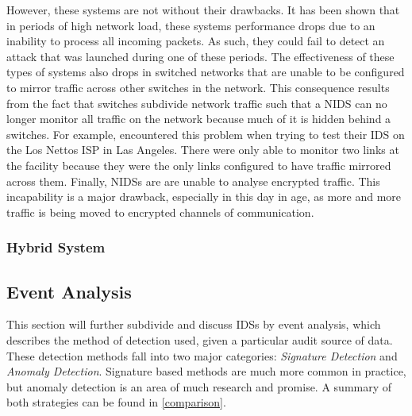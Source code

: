 \documentclass{acm_proc_article-sp}
\begin{document}
    		However, these systems are not without their drawbacks. It has been shown that in periods of high network load, these systems performance drops due to an inability to process all incoming packets. As such, they could fail to detect an attack that was launched during one of these periods. The effectiveness of these types of systems also drops in switched networks that are unable to be configured to mirror traffic across other switches in the network. This consequence results from the fact that switches subdivide network traffic such that a NIDS can no longer monitor all traffic on the network because much of it is hidden behind a switches. For example, \cite{Hussain2003} encountered this problem when trying to test their IDS on the Los Nettos ISP in Las Angeles. There were only able to monitor two links at the facility because they were the only links configured to have traffic mirrored across them.  Finally, NIDSs are are unable to analyse encrypted traffic. This incapability is a major drawback, especially in this day in age, as more and more traffic is being moved to encrypted channels of communication. 		
    	\subsubsection{Hybrid System}
    \subsection{Event Analysis}
   		This section will further subdivide and discuss IDSs by event analysis, which describes the method of detection used, given a particular audit source of data. These detection methods fall into two major categories: \emph{Signature Detection} and \emph{Anomaly Detection}. Signature based methods are much more common in practice, but anomaly detection is an area of much research and promise. A summary of both strategies can be found in \ref{comparison}.
\end{document}
